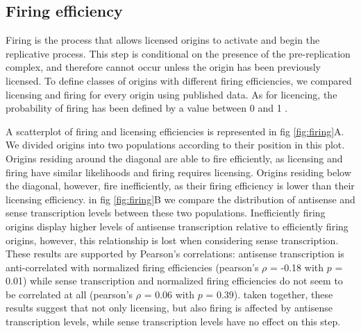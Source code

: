 \subsection{Firing efficiency}

Firing is the process that allows licensed origins to activate and begin the replicative process. This step is conditional on the presence of the pre-replication complex, and therefore cannot occur unless the origin has been previously licensed. To define classes of origins with different firing efficiencies, we compared licensing and firing for every origin using published data. As for licencing, the probability of firing has been defined by a value between 0 and 1 \cite{hawkins:2013:highresolution}.

A scatterplot of firing and licensing efficiencies is represented in fig \ref{fig:firing}A. We divided origins into two populations according to their position in this plot. Origins residing around the diagonal are able to fire efficiently, as licensing and firing have similar likelihoods and firing requires licensing. Origins residing below the diagonal, however, fire inefficiently, as their firing efficiency is lower than their licensing efficiency. in fig \ref{fig:firing}B we compare the distribution of antisense and sense transcription levels between these two populations. Inefficiently firing origins display higher levels of antisense transcription relative to efficiently firing origins, however, this relationship is lost when considering sense transcription. These results are supported by Pearson’s correlations: antisense transcription is anti-correlated with normalized firing efficiencies (pearson’s $\rho$ = -0.18 with $p$ = 0.01) while sense transcription and normalized firing efficiencies do not seem to be correlated at all (pearson’s $\rho$ = 0.06 with $p$ = 0.39). taken together, these results suggest that not only licensing, but also firing is affected by antisense transcription levels, while sense transcription levels have no effect on this step.
